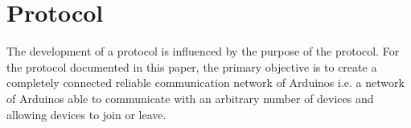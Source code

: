 \section{Protocol}
The development of a protocol is influenced by the purpose of the protocol.
For the protocol documented in this paper, the primary objective is to create a completely connected reliable communication network of Arduinos i.e. a network of Arduinos able to communicate with an arbitrary number of devices and allowing devices to join or leave.
